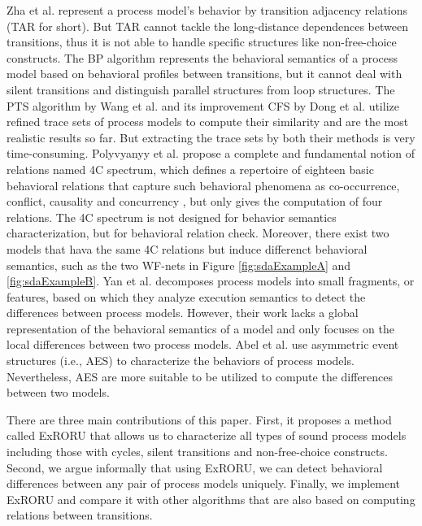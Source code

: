 \documentclass{llncs}
\begin{document}
Zha et al. \cite{zha2010workflow} represent a process model's behavior by transition adjacency relations (TAR for short). But TAR cannot tackle the long-distance dependences between transitions, thus it is not able to handle specific structures like non-free-choice constructs. The BP algorithm \cite{weidlich2011efficient} represents the behavioral semantics of a process model based on behavioral profiles between transitions, but it cannot deal with silent transitions and distinguish parallel structures from loop structures. The PTS algorithm by Wang et al. \cite{wang2010behavioral} and its improvement CFS by Dong et al. \cite{dong2014cfs} utilize refined trace sets of process models to compute their similarity and are the most realistic results so far. But extracting the trace sets by both their methods is very time-consuming. Polyvyanyy et al. \cite{polyvyanyy20144c} propose a complete and fundamental notion of relations named 4C spectrum, which defines a repertoire of eighteen basic behavioral relations that capture such behavioral phenomena as co-occurrence, conflict, causality and concurrency \cite{armas2014suitability}, but \cite{polyvyanyy20144c} only gives the computation of four relations. The 4C spectrum is not designed for behavior semantics characterization, but for behavioral relation check. Moreover, there exist two models that hava the same 4C relations but induce differenct behavioral semantics, such as the two WF-nets in Figure \ref{fig:sdaExampleA} and \ref{fig:sdaExampleB}. Yan et al. \cite{yan2014efficient} decomposes process models into small fragments, or features, based on which they analyze execution semantics to detect the differences between process models. However, their work lacks a global representation of the behavioral semantics of a model and only focuses on the local differences between two process models. Abel et al. \cite{armas2014behavioral} use asymmetric event structures (i.e., AES) to characterize the behaviors of process models. Nevertheless, AES are more suitable to be utilized to compute the differences between two models.

There are three main contributions of this paper. First, it proposes a method called ExRORU that allows us to characterize all types of sound process models including those with cycles, silent transitions and non-free-choice constructs. Second, we argue informally that using ExRORU, we can detect behavioral differences between any pair of process models uniquely. Finally, we implement ExRORU and compare it with other algorithms that are also based on computing relations between transitions.
\end{document}
